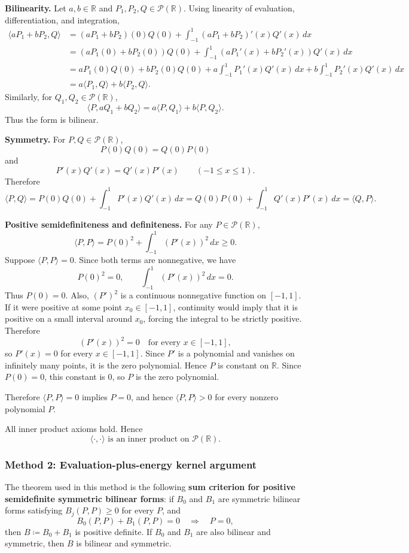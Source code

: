 \documentclass[12pt]{article}
\newcommand{\df}{\coloneqq}
\newcommand{\R}{\mathbb{R}}
\begin{document}
\medskip
\noindent\textbf{Bilinearity.}
Let $a,b\in\R$ and $P_1,P_2,Q\in\mathcal{P}(\R)$. Using linearity of evaluation, differentiation, and integration,
\begin{align*}
\langle aP_1+bP_2,Q\rangle
&=(aP_1+bP_2)(0)Q(0)+\int_{-1}^{1}(aP_1+bP_2)'(x)Q'(x)\,dx\\
&=(aP_1(0)+bP_2(0))Q(0)+\int_{-1}^{1}(aP_1'(x)+bP_2'(x))Q'(x)\,dx\\
&=aP_1(0)Q(0)+bP_2(0)Q(0)
+a\int_{-1}^{1}P_1'(x)Q'(x)\,dx
+b\int_{-1}^{1}P_2'(x)Q'(x)\,dx\\
&=a\langle P_1,Q\rangle+b\langle P_2,Q\rangle.
\end{align*}
Similarly, for $Q_1,Q_2\in\mathcal{P}(\R)$,
\[
\langle P,aQ_1+bQ_2\rangle=a\langle P,Q_1\rangle+b\langle P,Q_2\rangle.
\]
Thus the form is bilinear.

\medskip
\noindent\textbf{Symmetry.}
For $P,Q\in\mathcal{P}(\R)$,
\[
P(0)Q(0)=Q(0)P(0)
\]
and
\[
P'(x)Q'(x)=Q'(x)P'(x)
\qquad(-1\le x\le 1).
\]
Therefore
\[
\langle P,Q\rangle
=P(0)Q(0)+\int_{-1}^{1}P'(x)Q'(x)\,dx
=Q(0)P(0)+\int_{-1}^{1}Q'(x)P'(x)\,dx
=\langle Q,P\rangle.
\]

\medskip
\noindent\textbf{Positive semidefiniteness and definiteness.}
For any $P\in\mathcal{P}(\R)$,
\[
\langle P,P\rangle=P(0)^2+\int_{-1}^{1}(P'(x))^2\,dx\ge 0.
\]
Suppose $\langle P,P\rangle=0$. Since both terms are nonnegative, we have
\[
P(0)^2=0,
\qquad
\int_{-1}^{1}(P'(x))^2\,dx=0.
\]
Thus $P(0)=0$. Also, $(P')^2$ is a continuous nonnegative function on $[-1,1]$. If it were positive at some point $x_0\in[-1,1]$, continuity would imply that it is positive on a small interval around $x_0$, forcing the integral to be strictly positive. Therefore
\[
(P'(x))^2=0\quad\text{for every }x\in[-1,1],
\]
so $P'(x)=0$ for every $x\in[-1,1]$. Since $P'$ is a polynomial and vanishes on infinitely many points, it is the zero polynomial. Hence $P$ is constant on $\R$. Since $P(0)=0$, this constant is $0$, so $P$ is the zero polynomial.

Therefore $\langle P,P\rangle=0$ implies $P=0$, and hence $\langle P,P\rangle>0$ for every nonzero polynomial $P$.

All inner product axioms hold. Hence
\[
\boxed{\,\langle\cdot,\cdot\rangle \text{ is an inner product on }\mathcal{P}(\R).\,}
\]

\newpage
\subsubsection{Method 2: Evaluation-plus-energy kernel argument}
The theorem used in this method is the following \textbf{sum criterion for positive semidefinite symmetric bilinear forms}: if $B_0$ and $B_1$ are symmetric bilinear forms satisfying $B_j(P,P)\ge 0$ for every $P$, and
\[
B_0(P,P)+B_1(P,P)=0\quad\Longrightarrow\quad P=0,
\]
then $B\df B_0+B_1$ is positive definite. If $B_0$ and $B_1$ are also bilinear and symmetric, then $B$ is bilinear and symmetric.
\end{document}
